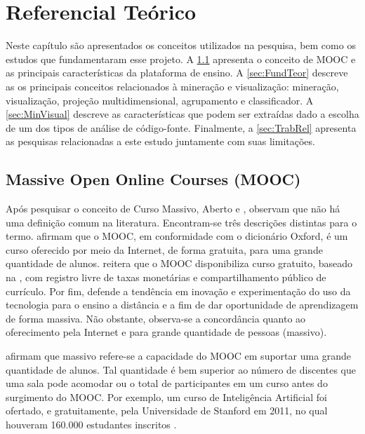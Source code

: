 \chapter{Referencial Teórico}
\label{chap:Ref}
	Neste capítulo são apresentados os conceitos utilizados na pesquisa, bem como
	os estudos que fundamentaram esse projeto. A \cref{sec:Mooc} apresenta
	o conceito de \acs{MOOC} e as principais características da plataforma de ensino.
	A \cref{sec:FundTeor} descreve as os principais conceitos relacionados à
	mineração e visualização: mineração, visualização, projeção multidimensional, agrupamento e
	classificador. A \cref{sec:MinVisual} descreve as características que
	podem ser extraídas dado a escolha de um dos tipos de análise de código-fonte.
	Finalmente, a \cref{sec:TrabRel} apresenta as pesquisas relacionadas a este estudo
	juntamente com suas limitações.

	\section{Massive Open Online Courses (MOOC)}
	\label{sec:Mooc}
		Após pesquisar o conceito de Curso Massivo, Aberto e ,
		 observam que não há uma definição comum na
		literatura. Encontram-se três descrições distintas para o termo.
		 afirmam que o \acs{MOOC}, em conformidade com o
		dicionário Oxford, é um curso oferecido por meio da Internet, de forma
		gratuita, para uma grande quantidade de alunos. 
		reitera que o \acs{MOOC} disponibiliza curso gratuito, baseado na ,
		com registro livre de taxas monetárias e compartilhamento público de
		currículo. Por fim,  defende a tendência em inovação e
		experimentação do uso da tecnologia para o ensino a distância e
		 a fim de dar oportunidade de aprendizagem de forma massiva.
		Não obstante, observa-se a concordância quanto ao oferecimento pela Internet
		e para grande quantidade de pessoas (massivo).
		
		 afirmam que massivo refere-se a capacidade do \acs{MOOC} em
		suportar uma grande quantidade de alunos. Tal quantidade é bem superior
		ao número de discentes que uma sala pode acomodar ou o total de
		participantes em um curso  antes do surgimento do \acs{MOOC}.
		Por exemplo, um curso de Inteligência Artificial foi ofertado, 
		e gratuitamente, pela Universidade de Stanford em 2011, no qual houveram
		160.000 estudantes inscritos \cite{rodriguez2012}.
		
